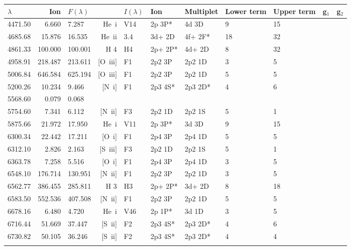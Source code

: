  \begin{longtable}{lrlrlllllll}
 \hline
 $ \lambda $ & Ion & $F \left( \lambda \right) $ && $I \left( \lambda \right) $ & Ion & Multiplet & Lower term & Upper term & g$_1$ & g$_2$ \\
 \hline
 4471.50 &   6.660 &   7.287 &  He~{\sc i}      &  V14       &  2p 3P*    &  4d 3D     &          9 &       15    \\
 4685.68 &  15.876 &  16.535 &  He~{\sc ii}     &  3.4       &  3d+ 2D    &  4f+ 2F*   &         18 &       32    \\
 4861.33 & 100.000 & 100.001 &  H 4       &  H4        &  2p+ 2P*   &  4d+ 2D    &          8 &       32          \\
 4958.91 & 218.487 & 213.611 &  [O~{\sc iii}]   &  F1        &  2p2 3P    &  2p2 1D    &          3 &        5    \\
 5006.84 & 646.584 & 625.194 &  [O~{\sc iii}]   &  F1        &  2p2 3P    &  2p2 1D    &          5 &        5    \\
 5200.26 &  10.234 &   9.466 &  [N~{\sc i}]     &  F1        &  2p3 4S*   &  2p3 2D*   &          4 &        6    \\
 5568.60 &   0.079 &   0.068                                                                                      \\
 5754.60 &   7.341 &   6.112 &  [N~{\sc ii}]    &  F3        &  2p2 1D    &  2p2 1S    &          5 &        1    \\
 5875.66 &  21.972 &  17.950 &  He~{\sc i}      &  V11       &  2p 3P*    &  3d 3D     &          9 &       15    \\
 6300.34 &  22.442 &  17.211 &  [O~{\sc i}]     &  F1        &  2p4 3P    &  2p4 1D    &          5 &        5    \\
 6312.10 &   2.826 &   2.163 &  [S~{\sc iii}]   &  F3        &  2p2 1D    &  2p2 1S    &          5 &        1    \\
 6363.78 &   7.258 &   5.516 &  [O~{\sc i}]     &  F1        &  2p4 3P    &  2p4 1D    &          3 &        5    \\
 6548.10 & 176.714 & 130.951 &  [N~{\sc ii}]    &  F1        &  2p2 3P    &  2p2 1D    &          3 &        5    \\
 6562.77 & 386.455 & 285.811 &  H 3       &  H3        &  2p+ 2P*   &  3d+ 2D    &          8 &       18          \\
 6583.50 & 552.536 & 407.508 &  [N~{\sc ii}]    &  F1        &  2p2 3P    &  2p2 1D    &          5 &        5    \\
 6678.16 &   6.480 &   4.720 &  He~{\sc i}      &  V46       &  2p 1P*    &  3d 1D     &          3 &        5    \\
 6716.44 &  51.669 &  37.447 &  [S~{\sc ii}]    &  F2        &  2p3 4S*   &  2p3 2D*   &          4 &        6    \\
 6730.82 &  50.105 &  36.246 &  [S~{\sc ii}]    &  F2        &  2p3 4S*   &  2p3 2D*   &          4 &        4    \\
 \hline
 \label{tab:/home/hmonteiro/Dropbox/work/devel/Neat_2d/neat-1.7/mz1/temp.out_linelist}
 \end{longtable}
